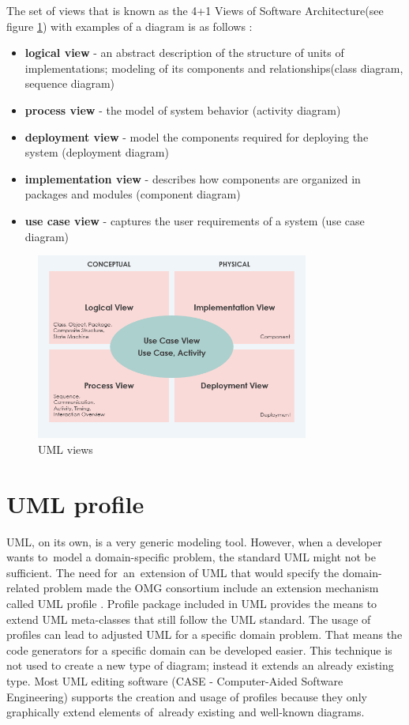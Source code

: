 The set of views that is known as the 4+1 Views of Software Architecture(see figure \ref{fig:views}) with examples of a diagram is as follows \cite{vpuml}:

\pagebreak

\begin{itemize}
\item \textbf{logical view} - an abstract description of the structure of units of implementations; modeling of its components and relationships(class diagram, sequence diagram)
\item \textbf{process view}  - the model of system behavior (activity diagram)
\item \textbf{deployment view}  - model the components required for deploying the system (deployment diagram)
\item \textbf{implementation view}  - describes how components are organized in packages and modules (component diagram)
\item \textbf{use case view}  - captures the user requirements of a system (use case diagram)
\end{itemize}

\begin{figure}[H]
    \centering
    \includegraphics[width=0.8\textwidth]{obrazky-figures/modeling-structure-views-using-uml.png}
    \caption{UML views}
    \label{fig:views}
\end{figure}

\section{UML profile}

UML, on its own, is a very generic modeling tool. However, when a developer wants to~model a domain-specific problem, the standard UML might not be sufficient. The need for~an~extension of UML that would specify the domain-related problem made the OMG consortium include an extension mechanism called UML profile \cite{dip-umlprofile}. Profile package included in UML provides the means to extend UML meta-classes that still follow the UML standard. The usage of profiles can lead to adjusted UML for a specific domain problem. That means the code generators for a specific domain can be developed easier.
This technique is not used to create a new type of diagram; instead it extends an already existing type. Most UML editing software (CASE - Computer-Aided Software Engineering) supports the creation and usage of profiles because they only graphically extend elements of~already existing and well-known diagrams.

